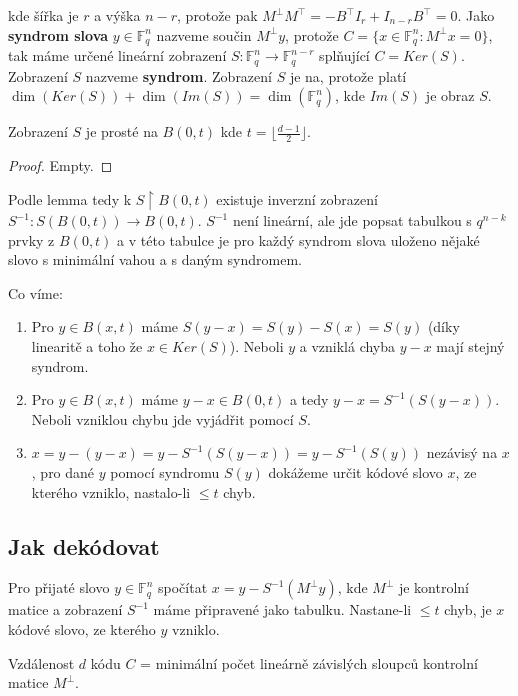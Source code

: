 kde šířka je $r$ a výška $n-r$, protože pak $M^{\bot} M^{\top} = -B^{\top}I_{r} + I_{n-r}B^{\top}=0$. Jako \textbf{syndrom slova} $y \in \mathbb{F}_{q}^{n}$ nazveme součin $M^{\bot}y$, protože $C = \{ x \in \mathbb{F}_{q}^{n}:M^{\bot}x=0 \}$, tak máme určené lineární zobrazení $S:\mathbb{F}_{q}^{n} \to \mathbb{F}_{q}^{n-r}$ splňující $C = Ker(S)$. Zobrazení $S$ nazveme \textbf{syndrom}. Zobrazení $S$ je na, protože platí $\dim(Ker(S)) + \dim(Im(S)) = \dim(\mathbb{F}_{q}^{n})$, kde $Im(S)$ je obraz $S$.

\begin{lemma}
	Zobrazení $S$ je prosté na $B(0,t)$ kde $t=\lfloor \frac{d-1}{2} \rfloor$.
\end{lemma}

\begin{proof}
	Empty.
\end{proof}

Podle lemma tedy k $S \restriction B(0,t)$ existuje inverzní zobrazení $S^{-1}: S(B(0,t)) \to B(0,t)$. $S^{-1}$ není lineární, ale jde popsat tabulkou s $q^{n-k}$ prvky z $B(0,t)$ a v této tabulce je pro každý syndrom slova uloženo nějaké slovo s minimální vahou a s daným syndromem.

Co víme:

\begin{enumerate}
	\item Pro $y \in B(x,t)$ máme $S(y-x) = S(y) - S(x) = S(y)$ (díky linearitě a toho že $x \in Ker(S)$). Neboli $y$ a vzniklá chyba $y-x$ mají stejný syndrom.
	\item Pro $y \in B(x,t)$ máme $y-x \in B(0,t)$ a tedy $y-x = S^{-1}(S(y-x))$. Neboli vzniklou chybu jde vyjádřit pomocí $S$.
	\item $x = y - (y - x) = y - S^{-1}(S(y-x)) = y - S^{-1}(S(y))$ nezávisý na $x$, pro dané $y$ pomocí syndromu $S(y)$ dokážeme určit kódové slovo $x$, ze kterého vzniklo, nastalo-li $\leq t$ chyb.
\end{enumerate}


\subsection{Jak dekódovat}

Pro přijaté slovo $y \in \mathbb{F}_{q}^{n}$ spočítat $x = y - S^{-1}(M^{\bot}y)$, kde $M^{\bot}$ je kontrolní matice a zobrazení $S^{-1}$ máme připravené jako tabulku. Nastane-li $\leq t$ chyb, je $x$ kódové slovo, ze kterého $y$ vzniklo.

\begin{tvrz}
	Vzdálenost $d$ kódu $C$ = minimální počet lineárně závislých sloupců kontrolní matice $M^{\bot}$.
\end{tvrz}

